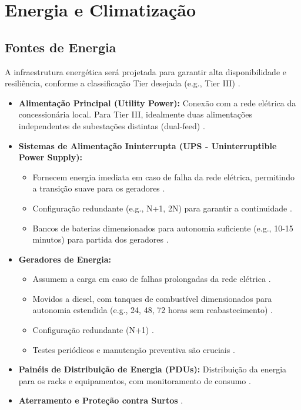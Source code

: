 \documentclass[
	12pt,				%
	oneside,			%
	a4paper,			%
	english,			%
	brazil				%
	]{abntex2unama}
\begin{document}
\chapter{Energia e Climatização}
\section{Fontes de Energia}
A infraestrutura energética será projetada para garantir alta disponibilidade e resiliência, conforme a classificação Tier desejada (e.g., Tier III) \cite{reliability_engineering}.
\begin{itemize}
	\item \textbf{Alimentação Principal (Utility Power):} Conexão com a rede elétrica da concessionária local. Para Tier III, idealmente duas alimentações independentes de subestações distintas (dual-feed) \cite{power_distribution}.
	\item \textbf{Sistemas de Alimentação Ininterrupta (UPS - Uninterruptible Power Supply):}
	      \begin{itemize}
		      \item Fornecem energia imediata em caso de falha da rede elétrica, permitindo a transição suave para os geradores \cite{design_principles}.
		      \item Configuração redundante (e.g., N+1, 2N) para garantir a continuidade \cite{datacenter_monitoring}.
		      \item Bancos de baterias dimensionados para autonomia suficiente (e.g., 10-15 minutos) para partida dos geradores \cite{reliability_engineering}.
	      \end{itemize}
	\item \textbf{Geradores de Energia:}
	      \begin{itemize}
		      \item Assumem a carga em caso de falhas prolongadas da rede elétrica \cite{power_distribution}.
		      \item Movidos a diesel, com tanques de combustível dimensionados para autonomia estendida (e.g., 24, 48, 72 horas sem reabastecimento) \cite{disaster_recovery}.
		      \item Configuração redundante (N+1) \cite{datacenter_security}.
		      \item Testes periódicos e manutenção preventiva são cruciais \cite{dcim_systems}.
	      \end{itemize}
	\item \textbf{Painéis de Distribuição de Energia (PDUs):} Distribuição da energia para os racks e equipamentos, com monitoramento de consumo \cite{dcim_evolution}.
	\item \textbf{Aterramento e Proteção contra Surtos} \cite{datacenter_security}.
\end{itemize}
\end{document}
